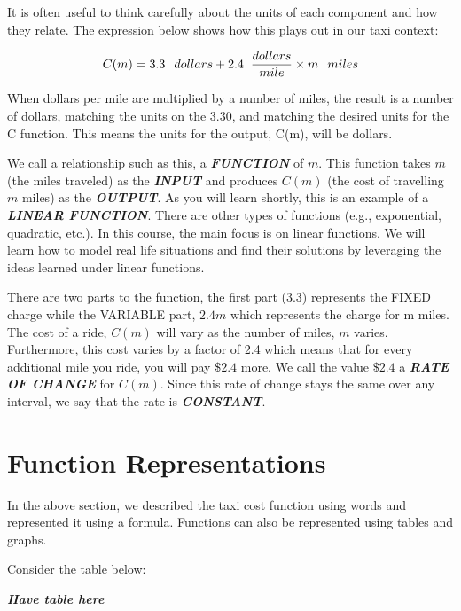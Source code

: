 \documentclass[
  letterpaper,
  DIV=11,
  numbers=noendperiod]{scrreprt}
\begin{document}
It is often useful to think carefully about the units of each component
and how they relate. The expression below shows how this plays out in
our taxi context:

\[C(m)=3.3 \hspace{.1in} dollars + 2.4 \hspace{.08in} \frac{dollars}{mile} \times m\hspace{.1in} miles\]

When dollars per mile are multiplied by a number of miles, the result is
a number of dollars, matching the units on the 3.30, and matching the
desired units for the C function. This means the units for the output,
C(m), will be dollars.

We call a relationship such as this, a \textbf{\emph{FUNCTION}} of
\(m\). This function takes \(m\) (the miles traveled) as the
\textbf{\emph{INPUT}} and produces \(C(m)\) (the cost of travelling
\(m\) miles) as the \textbf{\emph{OUTPUT}}. As you will learn shortly,
this is an example of a \textbf{\emph{LINEAR FUNCTION}}. There are other
types of functions (e.g., exponential, quadratic, etc.). In this course,
the main focus is on linear functions. We will learn how to model real
life situations and find their solutions by leveraging the ideas learned
under linear functions.

There are two parts to the function, the first part (3.3) represents the
FIXED charge while the VARIABLE part, \(2.4m\) which represents the
charge for m miles. The cost of a ride, \(C(m)\) will vary as the number
of miles, \(m\) varies. Furthermore, this cost varies by a factor of 2.4
which means that for every additional mile you ride, you will pay
\(\$ 2.4\) more. We call the value \(\$ 2.4\) a \textbf{\emph{RATE OF
CHANGE}} for \(C(m)\). Since this rate of change stays the same over any
interval, we say that the rate is \textbf{\emph{CONSTANT}}.

\hypertarget{function-representations}{%
\section{Function Representations}\label{function-representations}}

In the above section, we described the taxi cost function using words
and represented it using a formula. Functions can also be represented
using tables and graphs.

Consider the table below:

\textbf{\emph{Have table here}}
\end{document}
